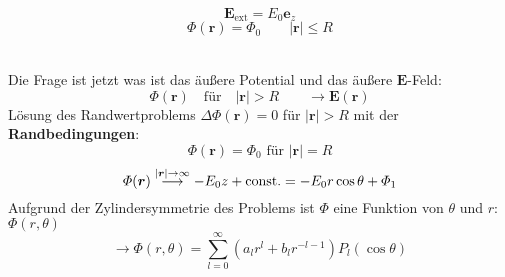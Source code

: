 \documentclass[titlepage,11pt,a4paper,ngerman]{report}
\newcommand{\tx}[1]{\textrm{#1}}
\newcommand{\const}{\tx{const.}}
\renewcommand{\Phi}{\varPhi}
\renewcommand{\vec}[1]{\boldsymbol{#1}}
\begin{document}
\begin{minipage}{.5\linewidth}
	\centering
	\vspace{5pt}
\end{minipage}
\begin{minipage}{.5\linewidth}
	\begin{equation*}
	\vec{E}_{\tx{ext}} = E_0 \vec{e}_z
	\end{equation*}
	\begin{equation*}
	\Phi(\vec{r}) = \Phi_0 \qquad |\vec{r}| \le R
	\end{equation*}
\end{minipage}\\[5pt]
Die Frage ist jetzt was ist das äußere Potential und das äußere $ \vec{E} $-Feld:
\begin{equation*}
\Phi(\vec{r}) \quad \tx{für} \quad |\vec{r}| > R \qquad \rightarrow \vec{E}(\vec{r})
\end{equation*}
Lösung des Randwertproblems $ \Delta \Phi(\vec{r}) = 0 $ für $ |\vec{r}| > R $ mit der \textbf{Randbedingungen}:
$$ \Phi(\vec{r}) = \Phi_0 \tx{ für }  |\vec{r}| = R $$
$$ \Phi(\vec{r}) \buildrel |\vec{r}| \to \infty \over \longrightarrow - E_0 z + \const = - E_0 r \cos\theta + \Phi_1 $$
Aufgrund der Zylindersymmetrie des Problems ist $ \Phi $ eine Funktion von $ \theta $ und $ r $: $ \Phi(r,\theta) $
\begin{equation*}
\rightarrow \Phi(r,\theta) = \sum_{l=0}^{\infty} \left(a_l r^l + b_l r^{-l-1}\right) P_l(\cos\theta)
\end{equation*}
\end{document}
